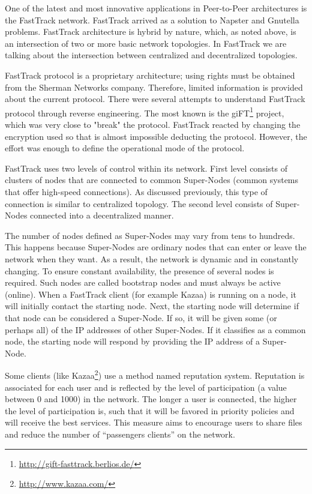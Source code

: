 One of the latest and most innovative  applications in Peer-to-Peer
architectures is the FastTrack network. FastTrack arrived as a solution to
Napster and Gnutella problems. FastTrack architecture is hybrid by nature,
which, as noted above, is an intersection of two or more basic network
topologies. In FastTrack we are talking about the intersection between
centralized and decentralized topologies.

FastTrack protocol is a proprietary architecture; using rights must be obtained
from the Sherman Networks company. Therefore, limited information is provided
about the current protocol. There were several attempts to understand
FastTrack protocol through reverse engineering. The most known is the
giFT\footnote{\url{http://gift-fasttrack.berlios.de/}}
project, which was very close to "break" the protocol. FastTrack reacted by
changing the encryption used so that is almost impossible deducting the
protocol. However, the effort was enough to define the operational mode of
the protocol.

FastTrack uses two levels of control within its network. First level consists
of clusters of nodes that are connected to common Super-Nodes (common systems
that offer high-speed connections). As discussed previously, this type of
connection is similar to centralized topology. The second level consists of
Super-Nodes connected into a decentralized manner.

The number of nodes defined as Super-Nodes may vary from tens to hundreds.
This happens because Super-Nodes are ordinary nodes that can enter or leave the
network when they want. As a result, the network is dynamic and in constantly
changing. To ensure constant availability, the presence of several nodes is
required. Such nodes are called bootstrap nodes and must always be active
(online). When a FastTrack client (for example Kazaa) is running on a node, it
will initially contact the starting node. Next, the starting node will
determine if that node can be considered a Super-Node. If so, it will be given
some (or perhaps all) of the IP addresses of other Super-Nodes. If it
classifies as a common node, the starting node will respond by providing
the IP address of a Super-Node.

Some clients (like Kazaa\footnote{\url{http://www.kazaa.com/}}) use a method named reputation system. Reputation is
associated for each user and is reflected by the level of participation (a value
between 0 and 1000) in the network. The longer a user is connected, the higher
the level of participation is, such that it will be favored in priority
policies and will receive the best services. This measure aims to encourage
users to share files and reduce the number of ``passengers clients'' on the
network.

